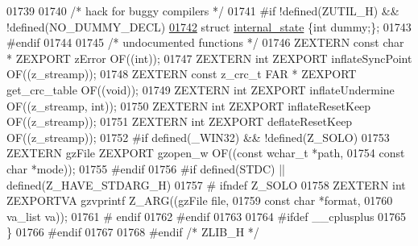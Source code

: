 \begin{DoxyCode}
01739 
01740 \textcolor{comment}{/* hack for buggy compilers */}
01741 \textcolor{preprocessor}{#if !defined(ZUTIL\_H) && !defined(NO\_DUMMY\_DECL)}
\hyperlink{structinternal__state}{01742}     \textcolor{keyword}{struct }\hyperlink{structinternal__state}{internal\_state} \{\textcolor{keywordtype}{int} dummy;\};
01743 \textcolor{preprocessor}{#endif}
01744 
01745 \textcolor{comment}{/* undocumented functions */}
01746 ZEXTERN \textcolor{keyword}{const} \textcolor{keywordtype}{char}   * ZEXPORT zError           OF((\textcolor{keywordtype}{int}));
01747 ZEXTERN \textcolor{keywordtype}{int}            ZEXPORT inflateSyncPoint OF((z\_streamp));
01748 ZEXTERN \textcolor{keyword}{const} z\_crc\_t FAR * ZEXPORT get\_crc\_table    OF((\textcolor{keywordtype}{void}));
01749 ZEXTERN \textcolor{keywordtype}{int}            ZEXPORT inflateUndermine OF((z\_streamp, \textcolor{keywordtype}{int}));
01750 ZEXTERN \textcolor{keywordtype}{int}            ZEXPORT inflateResetKeep OF((z\_streamp));
01751 ZEXTERN \textcolor{keywordtype}{int}            ZEXPORT deflateResetKeep OF((z\_streamp));
01752 \textcolor{preprocessor}{#if defined(\_WIN32) && !defined(Z\_SOLO)}
01753 ZEXTERN gzFile         ZEXPORT gzopen\_w OF((\textcolor{keyword}{const} \textcolor{keywordtype}{wchar\_t} *path,
01754                                             \textcolor{keyword}{const} \textcolor{keywordtype}{char} *mode));
01755 \textcolor{preprocessor}{#endif}
01756 \textcolor{preprocessor}{#if defined(STDC) || defined(Z\_HAVE\_STDARG\_H)}
01757 \textcolor{preprocessor}{#  ifndef Z\_SOLO}
01758 ZEXTERN \textcolor{keywordtype}{int}            ZEXPORTVA gzvprintf Z\_ARG((gzFile file,
01759                                                   \textcolor{keyword}{const} \textcolor{keywordtype}{char} *format,
01760                                                   va\_list va));
01761 \textcolor{preprocessor}{#  endif}
01762 \textcolor{preprocessor}{#endif}
01763 
01764 \textcolor{preprocessor}{#ifdef \_\_cplusplus}
01765 \}
01766 \textcolor{preprocessor}{#endif}
01767 
01768 \textcolor{preprocessor}{#endif }\textcolor{comment}{/* ZLIB\_H */}\textcolor{preprocessor}{}
\end{DoxyCode}
